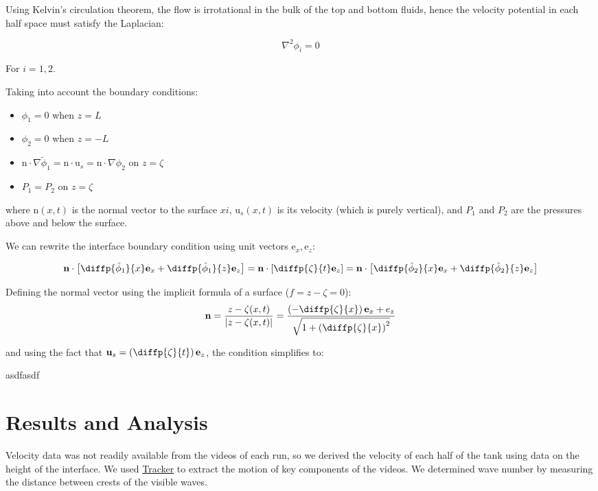\documentclass{article}
\renewcommand{\vec}[1]{\bm{\mathrm{#1}}}
\begin{document}
Using Kelvin's circulation theorem, the flow is irrotational in the bulk of the
top and bottom fluids, hence the velocity potential in each half space must
satisfy the Laplacian:

\[ \nabla^2 \phi_i = 0\]

For \(i = 1, 2\).

Taking into account the boundary conditions:

\begin{itemize}
    \item \(\phi_1 = 0\) when \(z = L\)
    \item \(\phi_2 = 0\) when \(z = -L\)
    \item \(\vec n \cdot \nabla \tilde \phi_1 = \vec n \cdot \vec u_s = \vec n \cdot \nabla \phi_2\) on \(z = \zeta\)
    \item \(P_1 = P_2\) on \(z = \zeta\)
\end{itemize}
where \(\vec n(x, t)\) is the normal vector to the surface \(xi\), \(\vec u_s(x,
t)\) is its velocity (which is purely vertical), and \(P_1\) and \(P_2\) are the pressures above and below
the surface.

We can rewrite the interface boundary condition using unit vectors \(\vec e_x, \vec e_z\):

\[ \vec n \cdot \left[ \diffp{\tilde \phi_1}{x} \vec e_x + \diffp{\tilde \phi_1}{z} \vec e_z\right] = \vec n \cdot \left[ \diffp{\zeta}{t} \vec e_z\right] = \vec n \cdot \left[\diffp{\tilde \phi_2}{x} \vec e_x + \diffp{\tilde \phi_2}{z} \vec e_z \right]\]

Defining the normal vector using the implicit formula of a surface (\(f = z - \zeta = 0\)):
\[\vec n = \frac{z - \zeta(x, t)}{|z - \zeta(x, t)|} = \frac{\left(-\diffp{\zeta}{x}\right)\vec e_x + e_z}{\sqrt{1 + \left(\diffp{\zeta}{x}\right)^2}}\]

and using the fact that \(\vec u_s = \left(\diffp{\zeta}{t}\right)\vec e_z\), the condition simplifies to:

asdfasdf

\section{Results and Analysis}

Velocity data was not readily available from the videos of each run, so we
derived the velocity of each half of the tank using data on the height of the
interface. We used \href{https://physlets.org/tracker/}{Tracker} to extract the
motion of key components of the videos. We determined wave number by measuring
the distance between crests of the visible waves.
\end{document}
